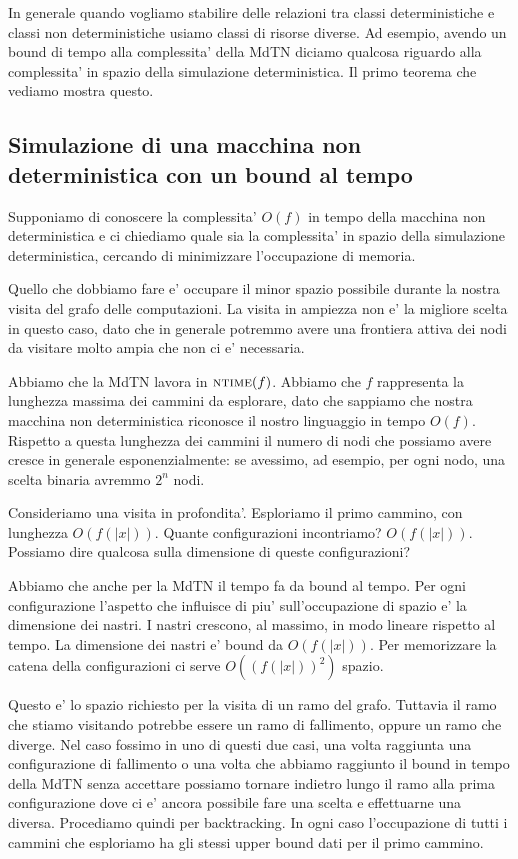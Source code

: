 
In generale quando vogliamo stabilire delle relazioni tra classi deterministiche e classi non
deterministiche usiamo classi di risorse diverse. Ad esempio, avendo un bound di tempo alla
complessita' della MdTN diciamo qualcosa riguardo alla complessita' in spazio della simulazione
deterministica. Il primo teorema che vediamo mostra questo.

\subsection{Simulazione di una macchina non deterministica con un bound al tempo}

Supponiamo di conoscere la complessita' $O(f)$ in tempo della macchina non deterministica e ci
chiediamo quale sia la complessita' in spazio della simulazione deterministica, cercando di
minimizzare l'occupazione di memoria.

Quello che dobbiamo fare e' occupare il minor spazio possibile durante la nostra visita del grafo
delle computazioni. La visita in ampiezza non e' la migliore scelta in questo caso, dato che in
generale potremmo avere una frontiera attiva dei nodi da visitare molto ampia che non ci e'
necessaria.

Abbiamo che la MdTN lavora in $\textsc{ntime}(f)$. Abbiamo che $f$ rappresenta la lunghezza massima dei
cammini da esplorare, dato che sappiamo che nostra macchina non deterministica riconosce il nostro
linguaggio in tempo $O(f)$. Rispetto a questa lunghezza dei cammini il numero di nodi che possiamo
avere cresce in generale esponenzialmente: se avessimo, ad esempio, per ogni nodo, una scelta
binaria avremmo $2^{n}$ nodi.

Consideriamo una visita in profondita'. Esploriamo il primo cammino, con lunghezza $O(f(|x|))$.
Quante configurazioni incontriamo? $O(f(|x|))$. Possiamo dire qualcosa sulla dimensione di queste
configurazioni?

Abbiamo che anche per la MdTN il tempo fa da bound al tempo. Per ogni configurazione l'aspetto che
influisce di piu' sull'occupazione di spazio e' la dimensione dei nastri. I nastri crescono, al
massimo, in modo lineare rispetto al tempo. La dimensione dei nastri e' bound da $O(f(|x|))$. Per
memorizzare la catena della configurazioni ci serve $O((f(|x|))^{2})$ spazio.

Questo e' lo spazio richiesto per la visita di un ramo del grafo. Tuttavia il ramo che stiamo
visitando potrebbe essere un ramo di fallimento, oppure un ramo che diverge. Nel caso fossimo in uno
di questi due casi, una volta raggiunta una configurazione di fallimento o una volta che abbiamo
raggiunto il bound in tempo della MdTN senza accettare possiamo tornare indietro lungo il ramo alla
prima configurazione dove ci e' ancora possibile fare una scelta e effettuarne una diversa.
Procediamo quindi per backtracking. In ogni caso l'occupazione di tutti i cammini che esploriamo ha
gli stessi upper bound dati per il primo cammino.

